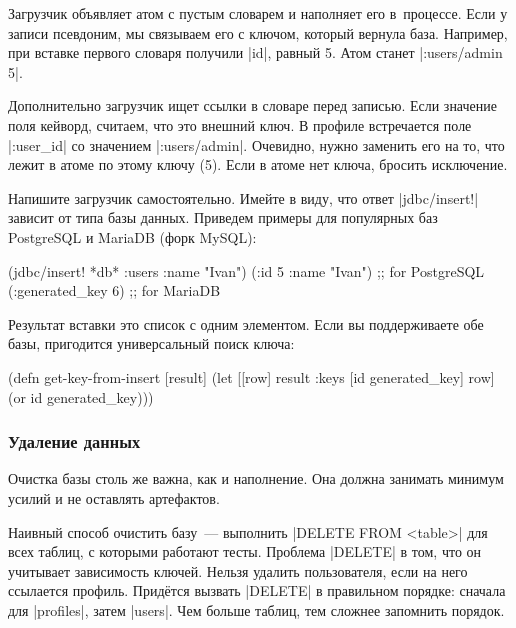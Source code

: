 Загрузчик объявляет атом с пустым словарем и наполняет его в~процессе. Если у
записи псевдоним, мы связываем его с ключом, который вернула база. Например, при
вставке первого словаря получили \spverb|id|, равный 5. Атом станет
\spverb|{:users/admin 5}|.

Дополнительно загрузчик ищет ссылки в словаре перед записью. Если значение
поля кейворд, считаем, что это внешний ключ. В профиле встречается поле
\spverb|:user_id| со значением \spverb|:users/admin|. Очевидно, нужно заменить
его на то, что лежит в атоме по этому ключу (5). Если в атоме нет ключа,
бросить исключение.


Напишите загрузчик самостоятельно. Имейте в виду, что ответ
\spverb|jdbc/insert!| зависит от типа базы данных. Приведем примеры для
популярных баз PostgreSQL и MariaDB (форк MySQL):

\begin{english}
  \begin{clojure}
(jdbc/insert! *db* :users {:name "Ivan"})
({:id 5 :name "Ivan"}) ;; for PostgreSQL
({:generated_key 6})  ;; for MariaDB
  \end{clojure}
\end{english}

Результат вставки это список с одним элементом. Если вы поддерживаете обе базы,
пригодится универсальный поиск ключа:

\begin{english}
  \begin{clojure}
(defn get-key-from-insert [result]
  (let [[row] result
        {:keys [id generated_key]} row]
    (or id generated_key)))
  \end{clojure}
\end{english}

\subsubsection*{Удаление данных}


Очистка базы столь же важна, как и наполнение. Она должна занимать минимум
усилий и не оставлять артефактов.

Наивный способ очистить базу~--- выполнить \spverb|DELETE FROM <table>| для всех
таблиц, с которыми работают тесты. Проблема \spverb|DELETE| в том, что он
учитывает зависимость ключей. Нельзя удалить пользователя, если на него
ссылается профиль. Прид\"{е}тся вызвать \spverb|DELETE| в правильном порядке:
сначала для \spverb|profiles|, затем \spverb|users|. Чем больше таблиц, тем
сложнее запомнить порядок.

